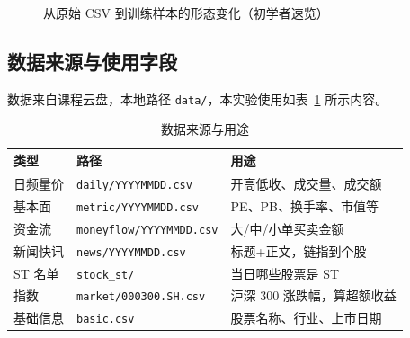 \documentclass[UTF8,a4paper,12pt]{ctexart}
\begin{document}
\begin{figure}[H]
\centering
{}
\caption{从原始 CSV 到训练样本的形态变化（初学者速览）}
\label{fig:data-pipeline}
\end{figure}

\subsection{数据来源与使用字段}

数据来自课程云盘，本地路径 \texttt{data/}，本实验使用如表~\ref{tab:data} 所示内容。

\begin{table}[H]
\centering
\caption{数据来源与用途}
\label{tab:data}
\begin{tabular}{llp{5.5cm}}
\toprule
\textbf{类型} & \textbf{路径} & \textbf{用途} \\
\midrule
日频量价   & \texttt{daily/YYYYMMDD.csv}   & 开高低收、成交量、成交额 \\
基本面     & \texttt{metric/YYYYMMDD.csv}    & PE、PB、换手率、市值等 \\
资金流     & \texttt{moneyflow/YYYYMMDD.csv} & 大/中/小单买卖金额 \\
新闻快讯   & \texttt{news/YYYYMMDD.csv}      & 标题+正文，链指到个股 \\
ST 名单    & \texttt{stock\_st/}             & 当日哪些股票是 ST \\
指数       & \texttt{market/000300.SH.csv}   & 沪深 300 涨跌幅，算超额收益 \\
基础信息   & \texttt{basic.csv}              & 股票名称、行业、上市日期 \\
\bottomrule
\end{tabular}
\end{table}
\end{document}
